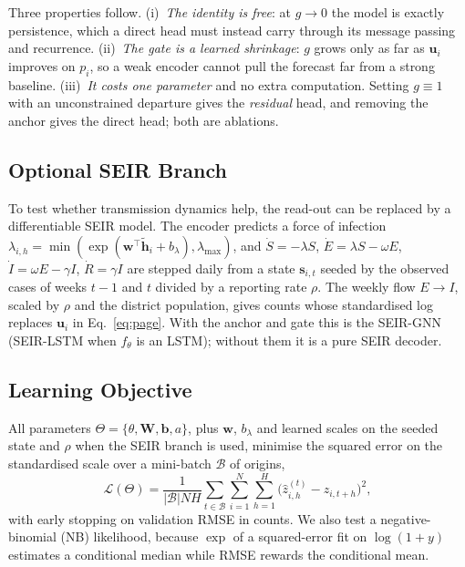 Three properties follow. (i)~\emph{The identity is free}: at $g\to0$ the model is
exactly persistence, which a direct head must instead carry through its message
passing and recurrence. (ii)~\emph{The gate is a learned shrinkage}: $g$ grows only as
far as $\mathbf{u}_i$ improves on $p_i$, so a weak encoder cannot pull the forecast far
from a strong baseline. (iii)~\emph{It costs one parameter} and no extra computation.
Setting $g\equiv1$ with an unconstrained departure gives the \emph{residual} head, and
removing the anchor gives the direct head; both are ablations.

\subsection{Optional SEIR Branch}
\label{sec:seir}
To test whether transmission dynamics help, the read-out can be replaced by a
differentiable SEIR model. The encoder predicts a force of infection
$\lambda_{i,h}=\min(\exp(\mathbf{w}^{\top}\tilde{\mathbf{h}}_i+b_\lambda),\lambda_{\max})$,
and $\dot S=-\lambda S$, $\dot E=\lambda S-\omega E$, $\dot I=\omega E-\gamma I$,
$\dot R=\gamma I$ are stepped daily from a state $\mathbf{s}_{i,t}$ seeded by the
observed cases of weeks $t-1$ and $t$ divided by a reporting rate $\rho$. The weekly
flow $E\to I$, scaled by $\rho$ and the district population, gives counts whose
standardised log replaces $\mathbf{u}_i$ in Eq.~\eqref{eq:page}. With the anchor and
gate this is the SEIR-GNN (SEIR-LSTM when $f_\theta$ is an LSTM); without them it is a
pure SEIR decoder.

\subsection{Learning Objective}
All parameters $\Theta=\{\theta,\mathbf{W},\mathbf{b},a\}$, plus $\mathbf{w}$,
$b_\lambda$ and learned scales on the seeded state and $\rho$ when the SEIR branch is
used, minimise the squared error on the standardised scale over a mini-batch
$\mathcal{B}$ of origins,
\begin{equation}
  \mathcal{L}(\Theta)=\frac{1}{|\mathcal{B}|NH}\sum_{t\in\mathcal{B}}
  \sum_{i=1}^{N}\sum_{h=1}^{H}\big(\hat z^{(t)}_{i,h}-z_{i,t+h}\big)^2,
\end{equation}
with early stopping on validation RMSE in counts. We also test a negative-binomial
(NB) likelihood, because $\exp$ of a squared-error fit on $\log(1+y)$ estimates a
conditional median while RMSE rewards the conditional mean.

